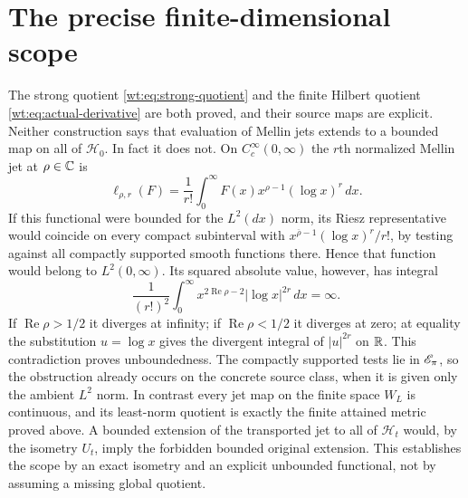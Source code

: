 \section{The precise finite-dimensional scope}
\label{wt:sec:scope}

The strong quotient \eqref{wt:eq:strong-quotient} and the finite
Hilbert quotient \eqref{wt:eq:actual-derivative} are both proved,
and their source maps are explicit.  Neither construction says
that evaluation of Mellin jets extends to a bounded map on all
of $\mathcal H_0$.  In fact it does not.  On $C_c^\infty(0,\infty)$
the $r$th normalized Mellin jet at $\rho\in\mathbb C$ is
\[
 \ell_{\rho,r}(F)=\frac1{r!}\int_0^\infty
       F(x)x^{\rho-1}(\log x)^r\,dx.
\]
If this functional were bounded for the $L^2(dx)$ norm, its
Riesz representative would coincide on every compact subinterval
with $x^{\overline\rho-1}(\log x)^r/r!$, by testing against
all compactly supported smooth functions there.  Hence that
function would belong to $L^2(0,\infty)$.  Its squared absolute
value, however, has integral
\[
 \frac1{(r!)^2}\int_0^\infty
   x^{2\operatorname{Re}\rho-2}|\log x|^{2r}\,dx=\infty.
\]
If $\operatorname{Re}\rho>1/2$ it diverges at infinity;
if $\operatorname{Re}\rho<1/2$ it diverges at zero; at equality
the substitution $u=\log x$ gives the divergent integral of
$|u|^{2r}$ on $\mathbb R$.  This contradiction proves unboundedness.
The compactly supported tests lie in $\mathscr E_\pi$, so the obstruction
already occurs on the concrete source class, when it is given
only the ambient $L^2$ norm.  In contrast every jet map on the
finite space $W_L$ is continuous, and its least-norm quotient
is exactly the finite attained metric proved above.  A bounded
extension of the transported jet to all of $\mathcal H_t$ would, by the
isometry $U_t$, imply the forbidden bounded original extension.
This establishes the scope by an exact isometry and an explicit
unbounded functional, not by assuming a missing global quotient.
